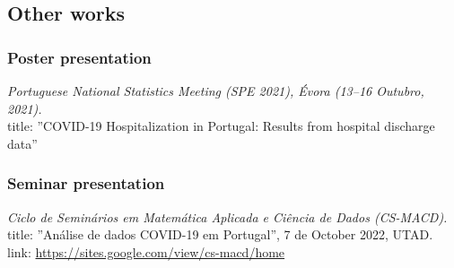 \documentclass[11pt,oneside,a4paper,titlepage]{article}
\begin{document}
%
\subsection{  Other works}

\subsubsection{Poster presentation}
\textit{Portuguese National Statistics Meeting (SPE 2021), Évora (13–16 Outubro, 2021).}\\
title: ''COVID-19 Hospitalization in Portugal: Results from hospital discharge data''\\

\subsubsection{Seminar presentation}
\textit{Ciclo de Seminários em Matemática Aplicada e Ciência de Dados (CS-MACD).}\\
title: ''Análise de dados COVID-19 em Portugal'', 7 de October 2022, UTAD.\\
link: \href{https://sites.google.com/view/cs-macd/home}{https://sites.google.com/view/cs-macd/home}\\
\end{document}
